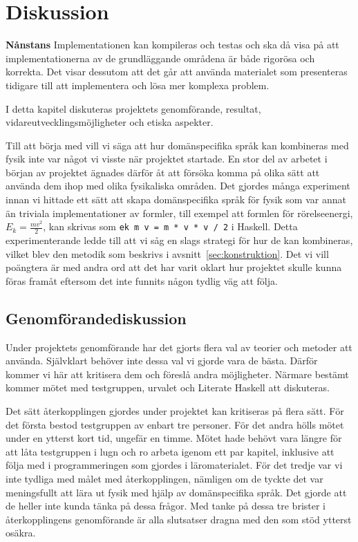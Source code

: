 
\chapter{Diskussion}\label{cha:disk}
\textbf{Nånstans}
Implementationen kan kompileras och testas och ska då visa på att
implementationerna av de grundläggande områdena är både rigorösa och korrekta.
Det visar dessutom att det går att använda materialet som presenteras tidigare
till att implementera och lösa mer komplexa problem.

I detta kapitel diskuteras projektets genomförande, resultat,
vidareutvecklingsmöjligheter och etiska aspekter.

Till att börja med vill vi säga att hur domänspecifika språk kan kombineras med
fysik inte var något vi visste när projektet startade. En stor del av arbetet i
början av projektet ägnades därför åt att försöka komma på olika sätt att
använda dem ihop med olika fysikaliska områden. Det gjordes många experiment
innan vi hittade ett sätt att skapa domänspecifika språk för fysik som var annat än
triviala implementationer av formler, till exempel att formlen för
rörelseenergi, $E_k = \frac{mv^2}{2}$, kan skrivas som \texttt{ek m v = m * v *
v / 2} i Haskell. Detta experimenterande ledde till att
vi såg en slags strategi för hur de kan kombineras, vilket blev den
metodik som beskrivs i avsnitt~\ref{sec:konstruktion}. Det vi vill poängtera är
med andra ord att det har varit oklart hur projektet skulle kunna föras
framåt eftersom det inte funnits någon tydlig väg att följa.

\section{Genomförandediskussion}

Under projektets genomförande har det gjorts flera val av teorier och metoder att använda. Självklart behöver inte dessa val vi gjorde vara de bästa. Därför kommer vi här att kritisera dem och föreslå andra möjligheter. Närmare bestämt kommer mötet med testgruppen, urvalet och Literate Haskell att diskuteras.

Det sätt återkopplingen gjordes under projektet kan kritiseras på flera sätt. För det första bestod testgruppen av enbart tre personer. För det andra hölls mötet under en ytterst kort tid, ungefär en timme. Mötet hade behövt vara längre för att låta testgruppen i lugn och ro arbeta igenom ett par kapitel, inklusive att följa med i programmeringen som gjordes i läromaterialet. För det tredje var vi inte tydliga med målet med återkopplingen, nämligen om de tyckte det var meningsfullt att lära ut fysik med hjälp av domänspecifika språk. Det gjorde att de heller inte kunda tänka på dessa frågor. Med tanke på dessa tre brister i återkopplingens genomförande är alla slutsatser dragna med den som stöd ytterst osäkra.

